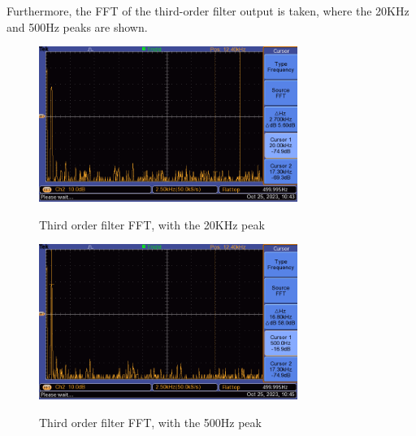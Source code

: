 Furthermore, the FFT of the third-order filter output is taken, where the 20KHz and 500Hz peaks are shown.

\begin{figure}[H]
    \centering
    \includegraphics[width=0.75\textwidth]{images/execution_03_third_order_fft_20.png}
    \label{fig:execution_03_third_order_fft_20}
    \caption{Third order filter FFT, with the 20KHz peak}
\end{figure}
\begin{figure}[H]
    \centering
    \includegraphics[width=0.75\textwidth]{images/execution_03_third_order_fft_05.png}
    \label{fig:execution_03_third_order_fft_05}
    \caption{Third order filter FFT, with the 500Hz peak}
\end{figure}


